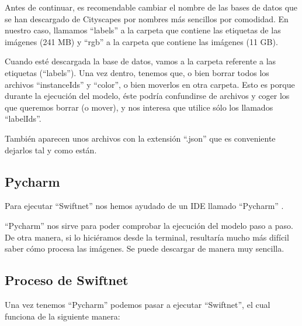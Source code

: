 Antes de continuar, es recomendable cambiar el nombre de las bases de datos que se han descargado de Cityscapes por nombres más sencillos por comodidad. En nuestro caso, llamamos ``labels'' a la carpeta que contiene las etiquetas de las imágenes (241 MB) y ``rgb'' a la carpeta que contiene las imágenes (11 GB).

Cuando esté descargada la base de datos, vamos a la carpeta referente a las etiquetas (``labels''). Una vez dentro, tenemos que, o bien borrar todos los archivos ``instanceIds'' y ``color'', o bien moverlos en otra carpeta. Esto es porque durante la ejecución del modelo, éste podría confundirse de archivos y coger los que queremos borrar (o mover), y nos interesa que utilice sólo los llamados ``labelIds''.

También aparecen unos archivos con la extensión ``.json'' que es conveniente dejarlos tal y como están.

\subsection{Pycharm}

Para ejecutar ``Swiftnet'' nos hemos ayudado de un \ac{IDE} llamado ``Pycharm'' \cite{pycharm}.

``Pycharm'' nos sirve para poder comprobar la ejecución del modelo paso a paso. De otra manera, si lo hiciéramos desde la terminal, resultaría mucho más difícil saber cómo procesa las imágenes. Se puede descargar de manera muy sencilla.

\subsection{Proceso de Swiftnet}

Una vez tenemos ``Pycharm'' podemos pasar a ejecutar ``Swiftnet'', el cual funciona de la siguiente manera:

